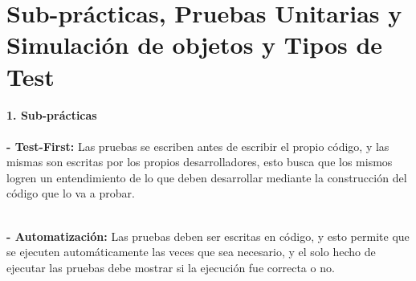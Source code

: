 \section{Sub-prácticas, Pruebas Unitarias y Simulación de objetos y Tipos de Test } 
\begin{flushleft}

\begin{itemize}
\textbf{1.	Sub-prácticas}
\textbf{}\\
\textbf{}\\
\textbf{ - Test-First:} Las pruebas se escriben antes de escribir el propio código, y las mismas son escritas por los propios desarrolladores, esto busca que los mismos logren un entendimiento de lo que deben desarrollar mediante la construcción del código que lo va a probar.

\textbf{}\\
\textbf{ - Automatización:} Las pruebas deben ser escritas en código, y esto permite que se ejecuten automáticamente las veces que sea necesario, y el solo hecho de ejecutar las pruebas debe mostrar si la ejecución fue correcta o no.


\end{itemize}
\end{flushleft}
